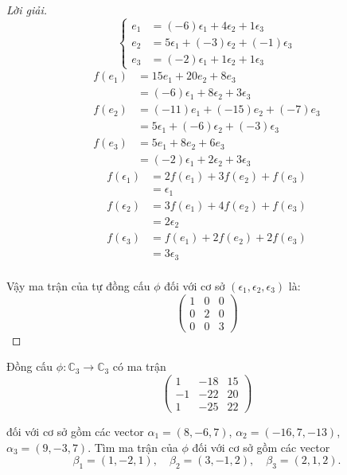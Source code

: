 \begin{proof}[Lời giải]
    \[
        \begin{cases}
            e_{1} & = (-6)\epsilon_{1} + 4\epsilon_{2} + 1\epsilon_{3}    \\
            e_{2} & = 5\epsilon_{1} + (-3)\epsilon_{2} + (-1)\epsilon_{3} \\
            e_{3} & = (-2)\epsilon_{1} + 1\epsilon_{2} + 1\epsilon_{3}
        \end{cases}
    \]
    \begin{align*}
        f(e_{1}) & = 15e_{1} + 20e_{2} + 8e_{3}                          \\
                 & = (-6)\epsilon_{1} + 8\epsilon_{2} + 3\epsilon_{3}    \\
        f(e_{2}) & = (-11)e_{1} + (-15)e_{2} + (-7)e_{3}                 \\
                 & = 5\epsilon_{1} + (-6)\epsilon_{2} + (-3)\epsilon_{3} \\
        f(e_{3}) & = 5e_{1} + 8e_{2} + 6e_{3}                            \\
                 & = (-2)\epsilon_{1} + 2\epsilon_{2} + 3\epsilon_{3}
    \end{align*}
    \begin{align*}
        f(\epsilon_{1}) & = 2f(e_{1}) + 3f(e_{2}) + f(e_{3}) \\
                        & = \epsilon_{1}                     \\
        f(\epsilon_{2}) & = 3f(e_{1}) + 4f(e_{2}) + f(e_{3}) \\
                        & = 2\epsilon_{2}                    \\
        f(\epsilon_{3}) & = f(e_{1}) + 2f(e_{2}) + 2f(e_{3}) \\
                        & = 3\epsilon_{3}                    \\
    \end{align*}
    
    Vậy ma trận của tự đồng cấu $\phi$ đối với cơ sở $(\epsilon_{1}, \epsilon_{2}, \epsilon_{3})$ là:
    \[
        \begin{pmatrix}
            1 & 0 & 0 \\
            0 & 2 & 0 \\
            0 & 0 & 3
        \end{pmatrix}
    \]
\end{proof}

\begin{exercise}
    Đồng cấu $\phi: \mathbb{C}_{3}\to\mathbb{C}_{3}$ có ma trận
    \[
        \begin{pmatrix}
            1  & -18 & 15 \\
            -1 & -22 & 20 \\
            1  & -25 & 22
        \end{pmatrix}
    \]
    
    đối với cơ sở gồm các vector $\alpha_{1} = (8, -6, 7)$, $\alpha_{2} = (-16, 7, -13)$, $\alpha_{3} = (9, -3, 7)$. Tìm ma trận của $\phi$ đối với cơ sở gồm các vector
    \[
        \beta_{1} = (1, -2, 1),\quad\beta_{2} = (3, -1, 2),\quad\beta_{3} = (2, 1, 2).
    \]
\end{exercise}

